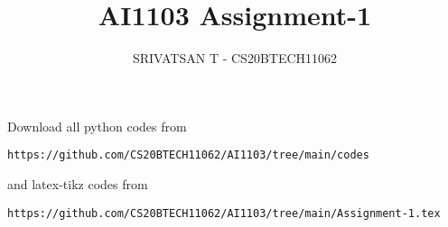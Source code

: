 \documentclass[journal,12pt,twocolumn]{IEEEtran}
\DeclareMathOperator*{\Res}{Res}
\begin{document}
\newcommand{\BEQA}{\begin{eqnarray}}
\newcommand{\EEQA}{\end{eqnarray}}
\newcommand{\define}{\stackrel{\triangle}{=}}

\raggedbottom
\setlength{\parindent}{0pt}
\providecommand{\mbf}{\mathbf}
\providecommand{\pr}[1]{\ensuremath{\Pr\left(#1\right)}}
\providecommand{\qfunc}[1]{\ensuremath{Q\left(#1\right)}}
\providecommand{\sbrak}[1]{\ensuremath{{}\left[#1\right]}}
\providecommand{\lsbrak}[1]{\ensuremath{{}\left[#1\right.}}
\providecommand{\rsbrak}[1]{\ensuremath{{}\left.#1\right]}}
\providecommand{\brak}[1]{\ensuremath{\left(#1\right)}}
\providecommand{\lbrak}[1]{\ensuremath{\left(#1\right.}}
\providecommand{\rbrak}[1]{\ensuremath{\left.#1\right)}}
\providecommand{\cbrak}[1]{\ensuremath{\left\{#1\right\}}}
\providecommand{\lcbrak}[1]{\ensuremath{\left\{#1\right.}}
\providecommand{\rcbrak}[1]{\ensuremath{\left.#1\right\}}}
\theoremstyle{remark}
\newtheorem{rem}{Remark}
\newcommand{\sgn}{\mathop{\mathrm{sgn}}}
\providecommand{\abs}[1]{\vert#1\vert}
\providecommand{\res}[1]{\Res\displaylimits_{#1}} 
\providecommand{\norm}[1]{\lVert#1\rVert}
\providecommand{\mtx}[1]{\mathbf{#1}}
\providecommand{\mean}[1]{E[#1]}
\providecommand{\fourier}{\overset{\mathcal{F}}{ \rightleftharpoons}}
\providecommand{\system}{\overset{\mathcal{H}}{ \longleftrightarrow}}
\newcommand{\solution}{\noindent \textbf{Solution: }}
\newcommand{\cosec}{\,\text{cosec}\,}
\providecommand{\dec}[2]{\ensuremath{\overset{#1}{\underset{#2}{\gtrless}}}}
\newcommand{\myvec}[1]{\ensuremath{\begin{pmatrix}#1\end{pmatrix}}}
\newcommand{\mydet}[1]{\ensuremath{\begin{vmatrix}#1\end{vmatrix}}}
\makeatletter
{}
\makeatother
\let\StandardTheFigure\thefigure
\let\vec\mathbf
\renewcommand{\thefigure}{\theproblem}
\def\putbox#1#2#3{\makebox[0in][l]{\makebox[#1][l]{}\raisebox{\baselineskip}[0in][0in]{\raisebox{#2}[0in][0in]{#3}}}}
     \def\rightbox#1{\makebox[0in][r]{#1}}
     \def\centbox#1{\makebox[0in]{#1}}
     \def\topbox#1{\raisebox{-\baselineskip}[0in][0in]{#1}}
     \def\midbox#1{\raisebox{-0.5\baselineskip}[0in][0in]{#1}}
\vspace{3cm}
\title{AI1103 Assignment-1}
\author{SRIVATSAN T - CS20BTECH11062}
\maketitle
\newpage
\bigskip
\renewcommand{\thefigure}{\theenumi}
\renewcommand{\thetable}{\theenumi}
Download all python codes from 
\begin{lstlisting}
https://github.com/CS20BTECH11062/AI1103/tree/main/codes
\end{lstlisting}
%
and latex-tikz codes from 
%
\begin{lstlisting}
https://github.com/CS20BTECH11062/AI1103/tree/main/Assignment-1.tex
\end{lstlisting}
\end{document}
